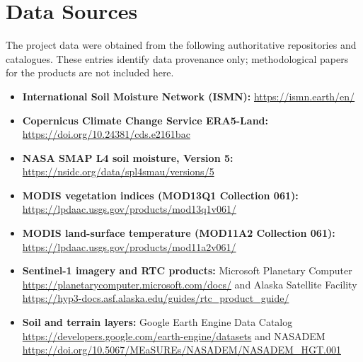 \documentclass[12pt,a4paper]{report}
\begin{document}
\section*{Data Sources}
The project data were obtained from the following authoritative repositories and
catalogues. These entries identify data provenance only; methodological papers
for the products are not included here.
\begin{itemize}
    \item \textbf{International Soil Moisture Network (ISMN):}
    \url{https://ismn.earth/en/}
    \item \textbf{Copernicus Climate Change Service ERA5-Land:}
    \url{https://doi.org/10.24381/cds.e2161bac}
    \item \textbf{NASA SMAP L4 soil moisture, Version 5:}
    \url{https://nsidc.org/data/spl4smau/versions/5}
    \item \textbf{MODIS vegetation indices (MOD13Q1 Collection 061):}
    \url{https://lpdaac.usgs.gov/products/mod13q1v061/}
    \item \textbf{MODIS land-surface temperature (MOD11A2 Collection 061):}
    \url{https://lpdaac.usgs.gov/products/mod11a2v061/}
    \item \textbf{Sentinel-1 imagery and RTC products:}
    Microsoft Planetary Computer \url{https://planetarycomputer.microsoft.com/docs/}
    and Alaska Satellite Facility \url{https://hyp3-docs.asf.alaska.edu/guides/rtc_product_guide/}
    \item \textbf{Soil and terrain layers:}
    Google Earth Engine Data Catalog
    \url{https://developers.google.com/earth-engine/datasets}
    and NASADEM
    \url{https://doi.org/10.5067/MEaSUREs/NASADEM/NASADEM_HGT.001}
\end{itemize}
\end{document}
